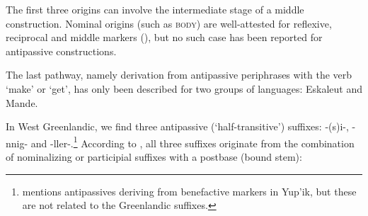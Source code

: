 \documentclass[oldfontcommands,oneside,a4paper,11pt]{article}
\newcommand{\ipa}[1]{{\phon \mbox{#1}}} %
\begin{document}
 
\begin{table}[H]
 \caption{Attested sources of antipassive markers} \label{tab:sources}
\end{table}
The first three origins can involve the intermediate stage of a middle construction. Nominal origins (such as \textsc{body}) are well-attested for reflexive, reciprocal and middle markers (\citealt[58]{heine-kuteva02}), but no such case has been reported for antipassive constructions. %


The last pathway, namely derivation from antipassive periphrases with the verb `make' or `get', has  only been described for two groups of languages: Eskaleut and Mande. 

In West Greenlandic, we find three antipassive (`half-transitive') suffixes: \ipa{-(s)i-}, \ipa{-nnig-} and \ipa{-ller-}.\footnote{\citet[97-8]{mithun00valency}  mentions antipassives deriving from benefactive markers in Yup'ik, but these are not related to the Greenlandic suffixes.} According to \citet{fortescue96halftrans}, all three suffixes originate from the combination of  nominalizing or   participial suffixes with a postbase (bound stem):
\end{document}
